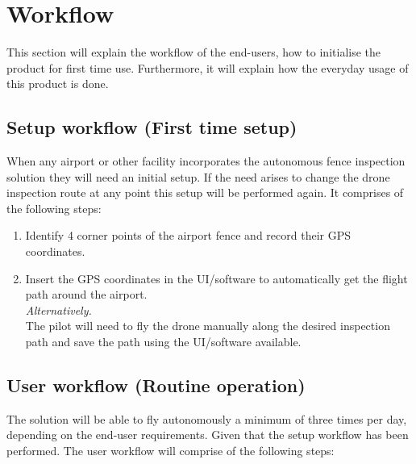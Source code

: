 \documentclass[../Head/Main.tex]{subfiles}
\begin{document}
\section{Workflow}
This section will explain the workflow of the end-users, how to initialise the product for first time use. Furthermore, it will explain how the everyday usage of this product is done.  

\subsection{Setup workflow (First time setup)}
\label{subsec:setup_workflow}
When any airport or other facility incorporates the autonomous fence inspection solution they will need an initial setup. If the need arises to change the drone inspection route at any point this setup will be performed again. It comprises of the following steps:
\begin{enumerate}
    \item Identify 4 corner points of the airport fence and record their GPS coordinates.
    \item Insert the GPS coordinates in the UI/software to automatically get the flight path around the airport.
    \\
    \textit{Alternatively.}
    \\
    The pilot will need to fly the drone manually along the desired inspection path and save the path using the UI/software available.
\end{enumerate}

\clearpage
\subsection{User workflow (Routine operation)}
\label{subsec:user_workflow}
The solution will be able to fly autonomously a minimum of three times per day, depending on the end-user requirements. Given that the setup workflow has been performed. The user workflow will comprise of the following steps:

\end{document}
